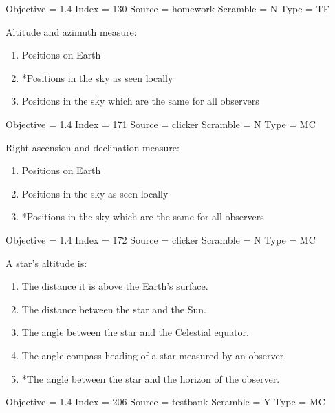 \documentclass[11pt]{article}
\begin{document}
\begin{enumerate}
\begin{minipage}{\textwidth}
\begin{minipage}{\textwidth}
Objective = 1.4
Index = 130
Source = homework
Scramble = N
Type = TF
\end{minipage}
\end{minipage}
\vskip 0.20in

\begin{minipage}{\textwidth}
\begin{minipage}{\textwidth}
\item Altitude and azimuth measure:
\begin{enumerate} 
\setlength{\itemsep}{1pt} 
\setlength{\parskip}{0pt} 
\setlength{\parsep}{0pt}
\setlength{\multicolsep}{1pt} 
\item Positions on Earth
\item *Positions in the sky as seen locally
\item Positions in the sky which are the same for all observers
\end{enumerate} 
Objective = 1.4
Index = 171
Source = clicker
Scramble = N
Type = MC
\end{minipage}
\end{minipage}
\vskip 0.20in

\begin{minipage}{\textwidth}
\begin{minipage}{\textwidth}
\item Right ascension and declination measure:
\begin{enumerate} 
\setlength{\itemsep}{1pt} 
\setlength{\parskip}{0pt} 
\setlength{\parsep}{0pt}
\setlength{\multicolsep}{1pt} 
\item Positions on Earth
\item Positions in the sky as seen locally
\item *Positions in the sky which are the same for all observers
\end{enumerate} 
Objective = 1.4
Index = 172
Source = clicker
Scramble = N
Type = MC
\end{minipage}
\end{minipage}
\vskip 0.20in

\begin{minipage}{\textwidth}
\begin{minipage}{\textwidth}
\item A star's altitude is:
\begin{enumerate} 
\setlength{\itemsep}{1pt} 
\setlength{\parskip}{0pt} 
\setlength{\parsep}{0pt}
\setlength{\multicolsep}{1pt} 
\item The distance it is above the Earth's surface.
\item The distance between the star and the Sun.
\item The angle between the star and the Celestial equator.
\item The angle compass heading of a star measured by an observer.
\item *The angle between the star and the horizon of the observer.
\end{enumerate} 
Objective = 1.4
Index = 206
Source = testbank
Scramble = Y
Type = MC
\end{minipage}
\end{minipage}
\vskip 0.20in


\end{enumerate}
\end{document}
